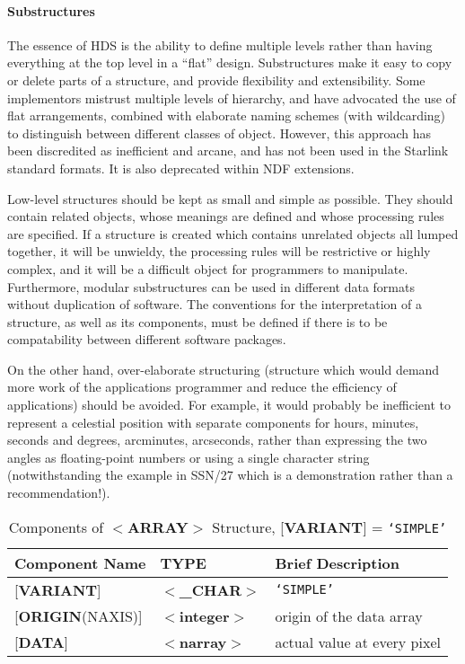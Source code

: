 \documentclass[twoside,11pt]{article}
\newcommand{\xref}[3]{#1}
\begin{document}
\paragraph{Substructures}
The essence of HDS is the ability to define
multiple levels rather than having everything at the
top level in a ``flat'' design.
Substructures make it easy to copy or delete parts of a structure, and
provide flexibility and extensibility.  Some implementors
mistrust multiple levels of hierarchy, and have advocated
the use of flat arrangements, combined with elaborate
naming schemes (with wildcarding) to distinguish between different
classes of object.  However, this approach has been
discredited as inefficient and arcane, and has not been used
in the Starlink standard formats.  It is also deprecated
within NDF extensions.

Low-level structures should be kept as small and simple as possible.
They should contain related objects, whose meanings are defined and
whose processing rules are specified.  If a
structure is created
which contains unrelated objects all lumped together, it
will be unwieldy, the
processing rules will be restrictive or highly complex, and it will
be a difficult object for programmers to manipulate.  Furthermore,
modular substructures can be used in different data formats without
duplication of software. The conventions for the interpretation of a
structure, as well as its components,
must be defined if there is to be compatability between
different software packages. 

On the other hand, over-elaborate structuring (structure which would
demand more work of the applications programmer and reduce the
efficiency of applications) should be avoided.  For example, it
would probably be inefficient to represent a
celestial position with separate components for hours, minutes, seconds
and degrees, arcminutes, arcseconds, rather than expressing
the two angles as floating-point numbers or using
a single character string (notwithstanding the example in 
\xref{SSN/27}{ssn27}, which is a demonstration rather than a recommendation!). 

\begin{table}[htb]
\centering
\caption{Components of $<${\bf ARRAY}$>$ Structure,
{[}{\bf VARIANT}{]} = {\tt `SIMPLE'}}
\label{ta:example2}
\begin{tabular}{|l|l|l|}
\hline
Component Name  & TYPE & Brief Description \\ \hline
{[}{\bf VARIANT}{]} & $<${\bf \_CHAR}$>$ & {\tt `SIMPLE'} \\
{[}{\bf ORIGIN}(NAXIS){]} & $<${\bf integer}$>$ & origin of the data array \\
{[}{\bf DATA}{]} & $<${\bf narray}$>$ & actual value at every pixel \\ \hline
\end{tabular}
\end{table}
\end{document}
